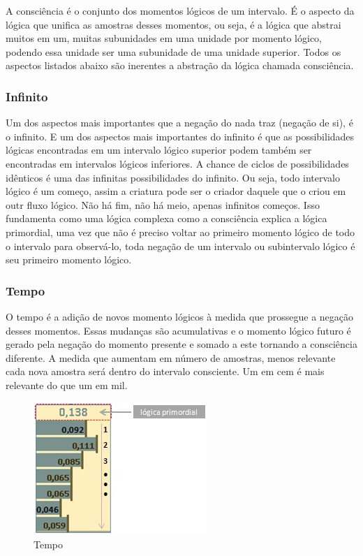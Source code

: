 A consciência é o conjunto dos momentos lógicos de um intervalo. É o aspecto da lógica que unifica as amostras desses momentos, ou seja, é a lógica que abstrai muitos em um, muitas subunidades em uma unidade por momento lógico, podendo essa unidade ser uma subunidade de uma unidade superior. Todos os aspectos listados abaixo são inerentes a abstração da lógica chamada consciência.

\subsubsection{Infinito}
Um dos aspectos mais importantes que a negação do nada traz (negação de si), é o infinito. E um dos aspectos mais importantes do infinito é que as possibilidades lógicas encontradas em um intervalo lógico superior podem também ser encontradas em intervalos lógicos inferiores. A chance de ciclos de possibilidades idênticos é uma das infinitas possibilidades do infinito. Ou seja, todo intervalo lógico é um começo, assim a criatura pode ser o criador daquele que o criou em outr fluxo lógico. Não há fim, não há meio, apenas infinitos começos. Isso fundamenta como uma lógica complexa como a consciência explica a lógica primordial, uma vez que não é preciso voltar ao primeiro momento lógico de todo o intervalo para observá-lo, toda negação de um intervalo  ou subintervalo lógico é seu primeiro momento lógico.

\subsubsection{Tempo}
O tempo é a adição de novos momento lógicos à medida que prossegue a negação desses momentos.  Essas mudanças são acumulativas e o momento lógico futuro é gerado pela negação do momento presente e somado a este tornando a consciência diferente. A medida que aumentam em número de amostras, menos relevante cada nova amostra será dentro do intervalo consciente. Um em cem é mais relevante do que um em mil. 

\begin{figure}[H]
\caption{Tempo}
\label{fig:consciousness_time}
\centering
\includegraphics[scale=1]{sections/images/consciousness_time.jpg}
\end{figure}

